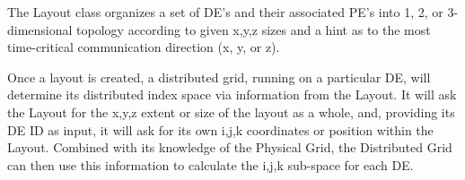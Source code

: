 
The Layout class organizes a set of DE's and their associated PE's into
1, 2, or 3-dimensional topology according to given x,y,z sizes and a hint
as to the most time-critical communication direction (x, y, or z).

Once a layout is created, a distributed grid, running on a particular DE,
will determine its distributed index space via information from the Layout.
It will ask the Layout for the x,y,z extent or size of the layout as a whole,
and, providing its DE ID as input, it will ask for its own i,j,k coordinates
or position within the Layout.  Combined with its knowledge of the Physical
Grid, the Distributed Grid can then use this information to calculate the
i,j,k sub-space for each DE.
